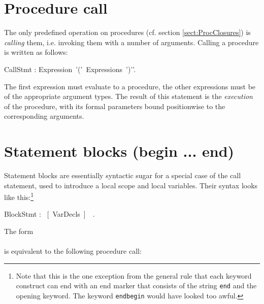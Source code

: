 

\section{Procedure call}\label{sect:Call}


The only predefined operation on procedures (cf. section
\ref{sect:ProcClosures}) is {\em calling} them, i.e. invoking them
with a number of arguments. Calling a procedure is written as
follows:


\bgr
CallStmt : Expression~'('~Expressions~')'\charSemi'.
\egr

The first expression must evaluate to a procedure, the other
expressions must be of the appropriate argument types. The result of
this statement is the {\em execution} of the procedure, with its
formal parameters bound positionwise to the corresponding arguments.



\section{Statement blocks (begin ... end)}\label{sect:Blocks}


Statement blocks are essentially syntactic sugar for a special case of
the call statement, used to introduce a local scope and local
variables. Their syntax looks like
this:\footnote{Note that this is
  the one exception from the general rule that each keyword construct
  can end with an end marker that consists of the string {\tt end}
  and the opening keyword. The keyword {\tt endbegin} would have
  looked too awful.}

\bgr
BlockStmt : \kwBegin~[\kwVar~VarDecls~\kwDo]~~\kwEnd .
\egr

The form\\
\\
is equivalent to the following procedure call:\\

